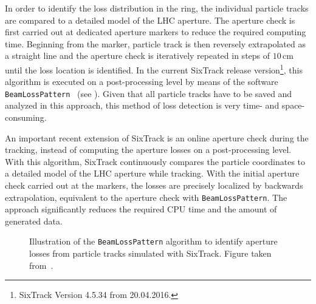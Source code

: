 In order to identify the loss distribution in the ring, the individual particle tracks are compared to a detailed model of the LHC aperture. The aperture check is first carried out at dedicated aperture markers to reduce the required computing time. Beginning from the marker, particle track is then reversely extrapolated as a straight line and the aperture check is iteratively repeated in steps of $10\,$cm until the loss location is identified.  In the current SixTrack release version\footnote{SixTrack Version 4.5.34 from 20.04.2016.}, this algorithm is executed on a post-processing level by means of the software \texttt{BeamLossPattern}~\cite{ChamonixXIV:BLP} (see ). Given that all particle tracks have to be saved and analyzed in this approach, this method of loss detection is very time- and space-consuming. 






An important recent extension of SixTrack is an online aperture check during the tracking, instead of computing the aperture losses on a post-processing level. With this algorithm, SixTrack continuously compares the particle coordinates to a detailed model of the LHC aperture while tracking. With the initial aperture check carried out at the markers, the losses are precisely localized by backwards extrapolation, equivalent to the aperture check with \texttt{BeamLossPattern}. The approach significantly reduces the required CPU time and the amount of  generated data.


\begin{figure}[htbp]
  \centering
  \caption{Illustration of the \texttt{BeamLossPattern} algorithm to identify aperture losses from particle tracks simulated with SixTrack. Figure taken from~\cite{ChamonixXIV:BLP}.}  
  \label{pic:15070701}
  \end{figure}


